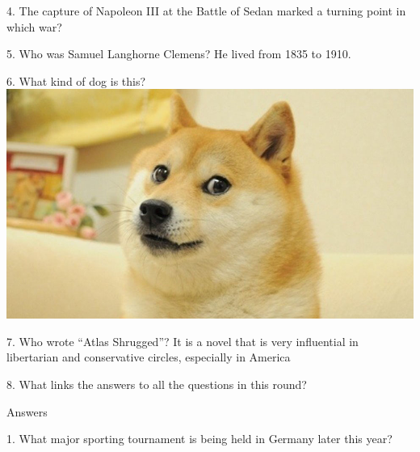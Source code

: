 \begin{frame}
\begin{center}
\Large
4. The capture of Napoleon III at the Battle of Sedan marked a turning point in which war?
\end{center}
\end{frame}
\begin{frame}
\begin{center}
\Large
5. Who was Samuel Langhorne Clemens? He lived from 1835 to 1910.
\end{center}
\end{frame}
\begin{frame}
\begin{center}
\Large
6. What kind of dog is this?
\\
\vspace{0.5em}\includegraphics[height=0.6\paperheight]{images/doge.jpg}
\end{center}
\end{frame}
\begin{frame}
\begin{center}
\Large
7. Who wrote ``Atlas Shrugged''? It is a novel that is very influential in libertarian and conservative circles, especially in America
\end{center}
\end{frame}
\begin{frame}
\begin{center}
\Large
8. What links the answers to all the questions in this round?
\end{center}
\end{frame}
\begin{frame}
\begin{center}
\Huge
Answers
\end{center}
\end{frame}
\begin{frame}
\begin{center}
\Large
1. What major sporting tournament is being held in Germany later this year?
\\
\end{center}
\end{frame}
